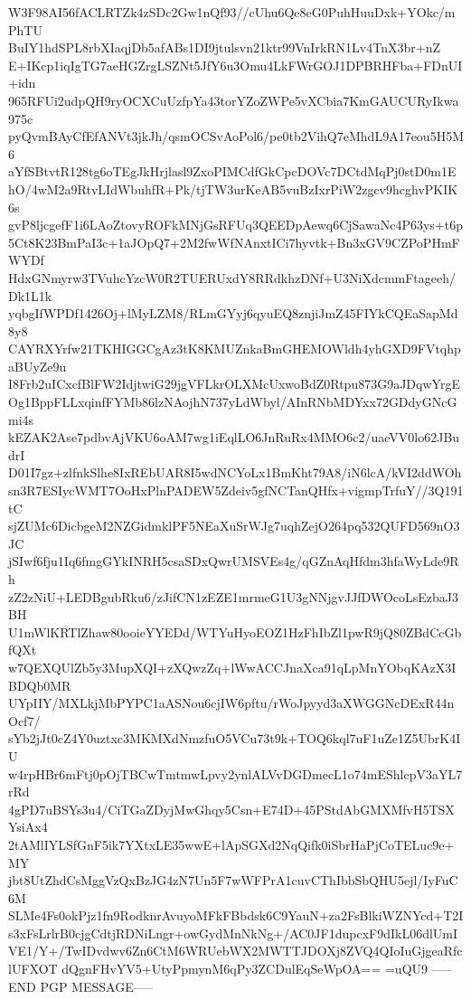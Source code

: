 W3F98AI56fACLRTZk4zSDc2Gw1nQf93//cUhu6Qe8eG0PuhHuuDxk+YOkc/mPhTU
BuIY1hdSPL8rbXIaqjDb5afABs1DI9jtulsvn21ktr99VnIrkRN1Lv4TnX3br+nZ
E+IKcp1iqIgTG7aeHGZrgLSZNt5JfY6u3Omu4LkFWrGOJ1DPBRHFba+FDnUI+idn
965RFUi2udpQH9ryOCXCuUzfpYa43torYZoZWPe5vXCbia7KmGAUCURyIkwa975c
pyQvmBAyCfEfANVt3jkJh/qsmOCSvAoPol6/pe0tb2VihQ7eMhdL9A17eou5H5M6
aYfSBtvtR128tg6oTEgJkHrjlasl9ZxoPIMCdfGkCpcDOVc7DCtdMqPj0stD0m1E
hO/4wM2a9RtvLIdWbuhfR+Pk/tjTW3urKeAB5vuBzIxrPiW2zgcv9hcghvPKIK6s
gvP8ljcgefF1i6LAoZtovyROFkMNjGsRFUq3QEEDpAewq6CjSawaNc4P63ys+t6p
5Ct8K23BmPaI3c+1aJOpQ7+2M2fwWfNAnxtICi7hyvtk+Bn3xGV9CZPoPHmFWYDf
HdxGNmyrw3TVuhcYzcW0R2TUERUxdY8RRdkhzDNf+U3NiXdcmmFtageeh/Dk1L1k
yqbgIfWPDf1426Oj+lMyLZM8/RLmGYyj6qyuEQ8znjiJmZ45FIYkCQEaSapMd8y8
CAYRXYrfw21TKHIGGCgAz3tK8KMUZnkaBmGHEMOWldh4yhGXD9FVtqhpaBUyZe9u
I8Frb2uICxcfBlFW2IdjtwiG29jgVFLkrOLXMcUxwoBdZ0Rtpu873G9aJDqwYrgE
Og1BppFLLxqinfFYMb86lzNAojhN737yLdWbyl/AInRNbMDYxx72GDdyGNcGmi4s
kEZAK2Ase7pdbvAjVKU6oAM7wg1iEqlLO6JnRuRx4MMO6c2/uaeVV0lo62JBudrI
D01I7gz+zlfnkSlhe8IxREbUAR8I5wdNCYoLx1BmKht79A8/iN6lcA/kVI2ddWOh
sn3R7ESIycWMT7OoHxPlnPADEW5Zdeiv5gfNCTanQHfx+vigmpTrfuY//3Q191tC
sjZUMc6DicbgeM2NZGidmklPF5NEaXuSrWJg7uqhZejO264pq532QUFD569nO3JC
jSIwf6fju1Iq6fmgGYkINRH5csaSDxQwrUMSVEs4g/qGZnAqHfdm3hfaWyLde9Rh
zZ2zNiU+LEDBgubRku6/zJifCN1zEZE1mrmeG1U3gNNjgvJJfDWOcoLsEzbaJ3BH
U1mWlKRTlZhaw80ooieYYEDd/WTYuHyoEOZ1HzFhIbZl1pwR9jQ80ZBdCcGbfQXt
w7QEXQUlZb5y3MupXQI+zXQwzZq+lWwACCJnaXca91qLpMnYObqKAzX3IBDQb0MR
UYpIIY/MXLkjMbPYPC1aASNou6cjIW6pftu/rWoJpyyd3aXWGGNcDExR44nOcf7/
sYb2jJt0cZ4Y0uztxc3MKMXdNmzfuO5VCu73t9k+TOQ6kql7uF1uZe1Z5UbrK4IU
w4rpHBr6mFtj0pOjTBCwTmtmwLpvy2ynlALVvDGDmecL1o74mEShlcpV3aYL7rRd
4gPD7uBSYs3u4/CiTGaZDyjMwGhqy5Csn+E74D+45PStdAbGMXMfvH5TSXYsiAx4
2tAMlIYLSfGnF5ik7YXtxLE35wwE+lApSGXd2NqQifk0iSbrHaPjCoTELuc9e+MY
jbt8UtZhdCsMggVzQxBzJG4zN7Un5F7wWFPrA1cuvCThIbbSbQHU5ejl/IyFuC6M
SLMe4Fs0okPjz1fn9RodknrAvuyoMFkFBbdsk6C9YauN+za2FsBlkiWZNYcd+T2I
s3xFsLrlrB0cjgCdtjRDNiLngr+owGydMnNkNg+/AC0JF1dupcxF9dIkL06dlUmI
VE1/Y+/TwIDvdwv6Zn6CtM6WRUebWX2MWTTJDOXj8ZVQ4QIoIuGjgeaRfclUFXOT
dQgnFHvYV5+UtyPpmynM6qPy3ZCDulEqSeWpOA==
=uQU9
-----END PGP MESSAGE-----
